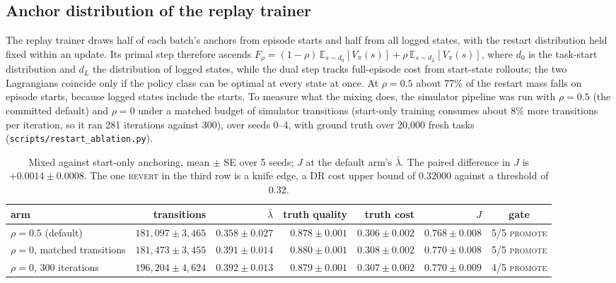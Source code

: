 \documentclass[10pt]{article}
\newcommand{\E}{\mathbb{E}}
\newcommand{\code}[1]{\texttt{#1}}
\newcommand{\PROMOTE}{\textsc{promote}}
\newcommand{\REVERT}{\textsc{revert}}
\begin{document}
\subsection{Anchor distribution of the replay trainer}
\label{app:restart}

The replay trainer draws half of each batch's anchors from episode starts and half from all logged states, with the restart distribution held fixed within an update. Its primal step therefore ascends $F_\rho=(1-\rho)\,\E_{s\sim d_0}[V_\pi(s)]+\rho\,\E_{s\sim d_L}[V_\pi(s)]$, where $d_0$ is the task-start distribution and $d_L$ the distribution of logged states, while the dual step tracks full-episode cost from start-state rollouts; the two Lagrangians coincide only if the policy class can be optimal at every state at once. At $\rho=0.5$ about 77\% of the restart mass falls on episode starts, because logged states include the starts. To measure what the mixing does, the simulator pipeline was run with $\rho=0.5$ (the committed default) and $\rho=0$ under a matched budget of simulator transitions (start-only training consumes about 8\% more transitions per iteration, so it ran 281 iterations against 300), over seeds 0--4, with ground truth over 20{,}000 fresh tasks (\code{scripts/restart\_ablation.py}).

\begin{table}[H]\centering\small
\begin{tabular}{lrrrrrc}\toprule
arm & transitions & $\bar\lambda$ & truth quality & truth cost & $J$ & gate \\\midrule
$\rho=0.5$ (default) & $181{,}097\pm3{,}465$ & $0.358\pm0.027$ & $0.878\pm0.001$ & $0.306\pm0.002$ & $0.768\pm0.008$ & 5/5 \PROMOTE \\
$\rho=0$, matched transitions & $181{,}473\pm3{,}455$ & $0.391\pm0.014$ & $0.880\pm0.001$ & $0.308\pm0.002$ & $0.770\pm0.008$ & 5/5 \PROMOTE \\
$\rho=0$, 300 iterations & $196{,}204\pm4{,}624$ & $0.392\pm0.013$ & $0.879\pm0.001$ & $0.307\pm0.002$ & $0.770\pm0.009$ & 4/5 \PROMOTE \\\bottomrule
\end{tabular}
\caption{Mixed against start-only anchoring, mean $\pm$ SE over 5 seeds; $J$ at the default arm's $\bar\lambda$. The paired difference in $J$ is $+0.0014\pm0.0008$. The one \REVERT{} in the third row is a knife edge, a DR cost upper bound of 0.32000 against a threshold of 0.32.}
\label{tab:restart}
\end{table}
\end{document}
